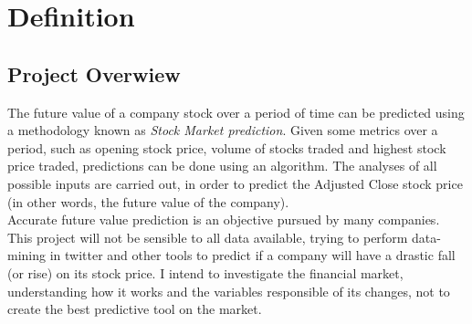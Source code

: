 \section{Definition}
\label{sec:definition}

\subsection{Project Overwiew}
The future value of a company stock over a period of time can be predicted using a methodology known as \emph{Stock Market prediction}\cite{Wiki}. 
Given some metrics over a period, such as opening stock price, volume of stocks traded and highest stock price traded, predictions can be done using an algorithm.
The analyses of all possible inputs are carried out, in order to predict the Adjusted Close stock price (in other words, the future value of the company).
\newline
\\
Accurate future value prediction is an objective pursued by many companies. This project will not be sensible to all data available, trying to perform data-mining in
twitter and other tools to predict if a company will have a drastic fall (or rise) on its stock price.
I intend to investigate the financial market, understanding how it works and the variables responsible of its changes, not to create the best predictive tool on the market. \\ 



